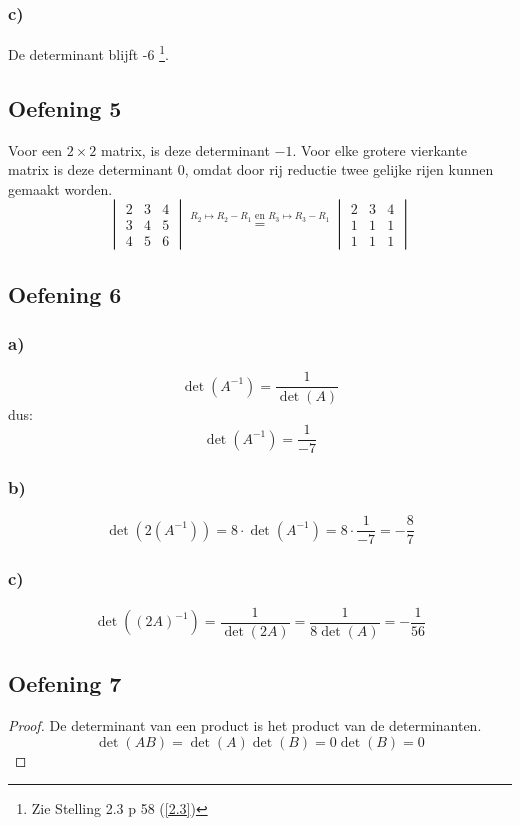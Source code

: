 \documentclass[lineaire_algebra_oplossingen.tex]{subfiles}
\begin{document}
\subsubsection*{c)}
De determinant blijft -6 \footnote{Zie Stelling 2.3 p 58 (\ref{2.3})}.
\subsection{Oefening 5}
Voor een $2\times2$ matrix, is deze determinant $-1$.
Voor elke grotere vierkante matrix is deze determinant $0$, omdat door rij reductie twee gelijke rijen kunnen gemaakt worden.
\[
\begin{vmatrix}
2 & 3 & 4\\
3 & 4 & 5\\
4 & 5 & 6
\end{vmatrix}
\overset{R_2 \longmapsto R_2-R_1 \text{ en } R_3 \longmapsto R_3 - R_1}{=}
\begin{vmatrix}
2 & 3 & 4\\
1 & 1 & 1\\
1 & 1 & 1
\end{vmatrix}
\]


\subsection{Oefening 6}
\subsubsection*{a)}
\[
\det(A^{-1}) = \frac{1}{\det(A)}
\]
dus:
\[
\det(A^{-1}) = \frac{1}{-7} 
\]
\subsubsection*{b)}
\[
\det(2(A^{-1})) = 8\cdot \det(A^{-1}) = 8 \cdot \frac{1}{-7} = -\frac{8}{7}
\]
\subsubsection*{c)}
\[
\det((2A)^{-1}) = \frac{1}{\det(2A)} = \frac{1}{8\det(A)} = -\frac{1}{56}
\]
\subsection{Oefening 7}
\begin{proof}
De determinant van een product is het product van de determinanten.
\[
\det(AB) = \det(A) \det(B) = 0 \det(B) = 0 
\]
\end{proof}
\end{document}
